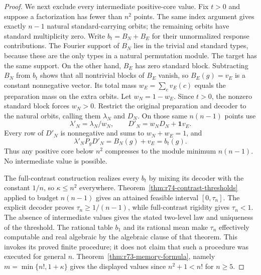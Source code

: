 \begin{proof}
We next exclude every intermediate positive-core value. Fix $t>0$
and suppose a factorization has fewer than $n^2$ points. The same
index argument gives exactly $n-1$ natural standard-carrying orbits;
the remaining orbits have standard multiplicity zero. Write
$b_t=B_N+B_E$ for their unnormalized response contributions. The
Fourier support of $B_N$ lies in the trivial and standard types,
because these are the only types in a natural permutation module.
The target has the same support. On the other hand, $B_E$ has zero
standard block. Subtracting $B_N$ from $b_t$ shows that all nontrivial
blocks of $B_E$ vanish, so $B_E(g)=v_E$ is a constant nonnegative
vector. Its total mass $w_E=\sum_c v_E(c)$ equals the preparation mass
on the extra orbits. Let $w_N=1-w_E$. Since $t>0$, the nonzero standard
block forces $w_N>0$. Restrict the original preparation and decoder to
the natural orbits, calling them $\lambda_N$ and $D_N$. On those same
$n(n-1)$ points use
\[
 \lambda'_N=\lambda_N/w_N,\qquad
 D'_N=w_ND_N+\mathbf1 v_E.
\]
Every row of $D'_N$ is nonnegative and sums to $w_N+w_E=1$, and
\[
 \lambda'_N P_gD'_N=B_N(g)+v_E=b_t(g).
\]
Thus any positive core below $n^2$ compresses to the module minimum
$n(n-1)$. No intermediate value is possible.

The full-contrast construction realizes every $b_t$ by mixing its
decoder with the constant $1/n$, so $\kappa\le n^2$ everywhere.
Theorem~\ref{thm:r74-contrast-thresholds} applied to budget $n(n-1)$
gives an attained feasible interval $[0,\tau_n]$. The explicit decoder
proves $\tau_n\ge1/(n-1)$, while full-contrast rigidity gives
$\tau_n<1$. The absence of intermediate values gives the stated
two-level law and uniqueness of the threshold. The rational table
$b_1$ and its rational mean make $\tau_n$ effectively computable and
real algebraic by the algebraic clause of that theorem. This invokes
its proved finite procedure; it does not claim that such a procedure
was executed for general $n$. Theorem~\ref{thm:r73-memory-formula}, namely
$m=\min\{n!,1+\kappa\}$ gives the displayed values since
$n^2+1<n!$ for $n\ge5$.
\end{proof}

